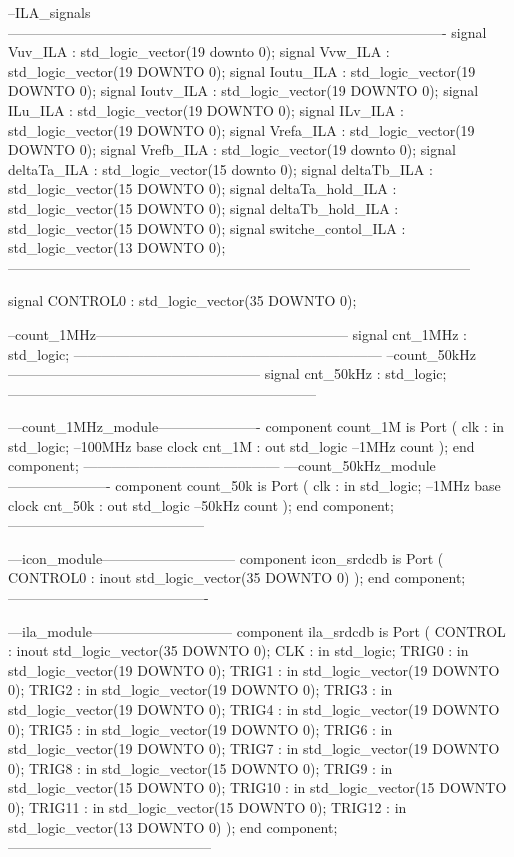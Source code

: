 \begin{mylisting}[language=VHDL,caption=トップモジュール,label=appF_Top_module_VHDL]
--ILA_signals----------------------------------------------------------------------------------------------
	signal	Vuv_ILA					: std_logic_vector(19 downto 0);
	signal	Vvw_ILA					: std_logic_vector(19 DOWNTO 0);
	signal	Ioutu_ILA				: std_logic_vector(19 DOWNTO 0);
	signal	Ioutv_ILA				: std_logic_vector(19 DOWNTO 0);
	signal	ILu_ILA					: std_logic_vector(19 DOWNTO 0);
	signal   ILv_ILA					: std_logic_vector(19 DOWNTO 0);
	signal   Vrefa_ILA				: std_logic_vector(19 DOWNTO 0);
	signal   Vrefb_ILA				: std_logic_vector(19 downto 0);
	signal	deltaTa_ILA				: std_logic_vector(15 downto 0);
	signal	deltaTb_ILA				: std_logic_vector(15 DOWNTO 0);
	signal	deltaTa_hold_ILA		: std_logic_vector(15 DOWNTO 0);
	signal	deltaTb_hold_ILA		: std_logic_vector(15 DOWNTO 0);
	signal	switche_contol_ILA	: std_logic_vector(13 DOWNTO 0);
---------------------------------------------------------------------------------------------------

	signal	CONTROL0	: std_logic_vector(35 DOWNTO 0);

--count_1MHz------------------------------------------------------
	signal	cnt_1MHz					: std_logic;
------------------------------------------------------------------
--count_50kHz------------------------------------------------------
	signal	cnt_50kHz					: std_logic;
------------------------------------------------------------------

---count_1MHz_module----------------------
	component count_1M is
		Port (
			clk	: in std_logic; --100MHz base clock
			cnt_1M	: out std_logic --1MHz count
		);
	end component;
------------------------------------------
---count_50kHz_module----------------------
	component count_50k is
		Port (
			clk	: in std_logic; --1MHz base clock
			cnt_50k	: out std_logic --50kHz count
		);
	end component;
------------------------------------------

---icon_module-----------------------------
	component icon_srdcdb is
		Port (
			CONTROL0	: inout std_logic_vector(35 DOWNTO 0)
		);
	end component;
-------------------------------------------

---ila_module------------------------------
	component ila_srdcdb is
		Port (
			CONTROL	: inout std_logic_vector(35 DOWNTO 0);
			CLK		: in std_logic;
			TRIG0		: in std_logic_vector(19 DOWNTO 0);
			TRIG1		: in std_logic_vector(19 DOWNTO 0);
			TRIG2		: in std_logic_vector(19 DOWNTO 0);
			TRIG3		: in std_logic_vector(19 DOWNTO 0);
			TRIG4		: in std_logic_vector(19 DOWNTO 0);
			TRIG5		: in std_logic_vector(19 DOWNTO 0);
			TRIG6		: in std_logic_vector(19 DOWNTO 0);
			TRIG7		: in std_logic_vector(19 DOWNTO 0);
			TRIG8		: in std_logic_vector(15 DOWNTO 0);
			TRIG9		: in std_logic_vector(15 DOWNTO 0);
			TRIG10	: in std_logic_vector(15 DOWNTO 0);
			TRIG11	: in std_logic_vector(15 DOWNTO 0);
			TRIG12	: in std_logic_vector(13 DOWNTO 0)
			);
	end component;
--------------------------------------------




\end{mylisting}
